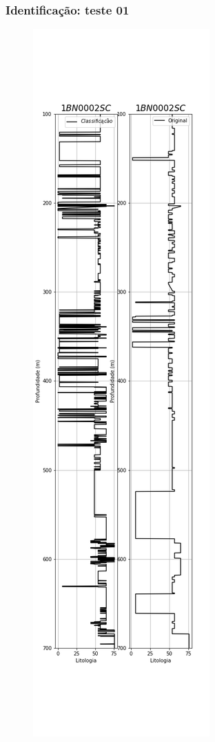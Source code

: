 \documentclass[aspectratio=10]{beamer} %
\begin{document}
\begin{frame}
	\frametitle{Identificação: teste 01}
	\begin{figure}[H]
		\centering
		\includegraphics[scale=0.18]{Imagens/result01.png}
		\label{IDt01}
	\end{figure} 
\end{frame}
\end{document}
